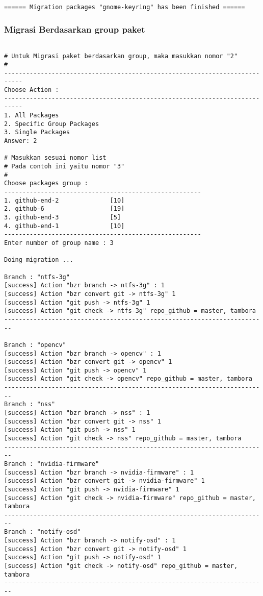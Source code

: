 {\begin{lstlisting}[language=ShellBash2]
====== Migration packages "gnome-keyring" has been finished ======
\end{lstlisting}

\subsubsection{Migrasi Berdasarkan group paket}

\begin{lstlisting}[language=ShellBash2]

# Untuk Migrasi paket berdasarkan group, maka masukkan nomor "2"
#
---------------------------------------------------------------------------
Choose Action : 
---------------------------------------------------------------------------
1. All Packages
2. Specific Group Packages
3. Single Packages
Answer: 2

# Masukkan sesuai nomor list
# Pada contoh ini yaitu nomor "3"
#
Choose packages group : 
------------------------------------------------------
1. github-end-2              [10]
2. github-6                  [19]
3. github-end-3              [5]
4. github-end-1              [10]
------------------------------------------------------
Enter number of group name : 3

Doing migration ...

Branch : "ntfs-3g"
[success] Action "bzr branch -> ntfs-3g" : 1
[success] Action "bzr convert git -> ntfs-3g" 1
[success] Action "git push -> ntfs-3g" 1
[success] Action "git check -> ntfs-3g" repo_github = master, tambora
------------------------------------------------------------------------

Branch : "opencv"
[success] Action "bzr branch -> opencv" : 1
[success] Action "bzr convert git -> opencv" 1
[success] Action "git push -> opencv" 1
[success] Action "git check -> opencv" repo_github = master, tambora
------------------------------------------------------------------------
Branch : "nss"
[success] Action "bzr branch -> nss" : 1
[success] Action "bzr convert git -> nss" 1
[success] Action "git push -> nss" 1
[success] Action "git check -> nss" repo_github = master, tambora
------------------------------------------------------------------------
Branch : "nvidia-firmware"
[success] Action "bzr branch -> nvidia-firmware" : 1
[success] Action "bzr convert git -> nvidia-firmware" 1
[success] Action "git push -> nvidia-firmware" 1
[success] Action "git check -> nvidia-firmware" repo_github = master, tambora
------------------------------------------------------------------------
Branch : "notify-osd"
[success] Action "bzr branch -> notify-osd" : 1
[success] Action "bzr convert git -> notify-osd" 1
[success] Action "git push -> notify-osd" 1
[success] Action "git check -> notify-osd" repo_github = master, tambora
------------------------------------------------------------------------


\end{lstlisting}}
